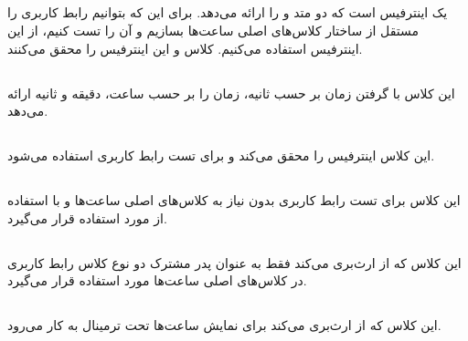 \documentclass[oneside,a4paper,11pt]{report}
\begin{document}
	\subsection{}
	
	یک اینترفیس است که دو متد 
	و
	را ارائه می‌دهد. برای این که بتوانیم رابط کاربری را مستقل از ساختار کلاس‌های اصلی ساعت‌ها بسازیم و آن را تست کنیم، از این اینترفیس استفاده می‌کنیم.
	کلاس
	و
	این اینترفیس را محقق می‌کنند.
	
	\subsection{}
	
	این کلاس با گرفتن زمان بر حسب ثانیه، زمان را بر حسب ساعت، دقیقه و ثانیه ارائه می‌دهد.
	
	
	
	\subsection{}
	این کلاس اینترفیس 
	را محقق می‌کند و برای تست رابط کاربری استفاده می‌شود.
	
	\subsection{}
	این کلاس برای تست رابط کاربری بدون نیاز به کلاس‌های اصلی ساعت‌ها و با استفاده از 
	مورد استفاده قرار می‌گیرد.
	
	\subsection{}
	
	این کلاس که از 
	ارث‌بری می‌کند فقط به عنوان پدر مشترک دو نوع کلاس رابط کاربری در کلاس‌های اصلی ساعت‌ها مورد استفاده قرار می‌گیرد.
	
	\subsection{}
	
	این کلاس که از 
	ارث‌بری می‌کند برای نمایش ساعت‌ها تحت ترمینال به کار می‌رود.
	
	\subsection{}
	
\end{document}
